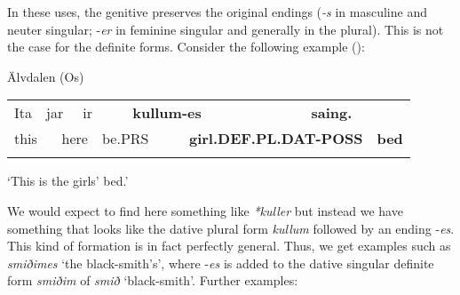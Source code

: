 In these uses, the genitive preserves the original endings (\textit{\nobreakdash-s }in masculine and neuter singular; \nobreakdash-\textit{er} in feminine singular and generally in the plural). This is not the case for the definite forms. Consider the following example (\citet[96]{Levander1909}):


\begin{listWWNumileveli}
\item {}

\begin{styleExample}
Älvdalen (Os)

\end{styleExample}

\end{listWWNumileveli}

\begin{tabular}{llllllllll}
\lsptoprule
Ita & \multicolumn{2}{l}{jar

} & \multicolumn{2}{l}{ir

} & \multicolumn{2}{l}{{\bfseries kullum-es}

} & \multicolumn{2}{l}{{\bfseries saing.}

} & \\
\multicolumn{2}{l}{this

} & \multicolumn{2}{l}{here

} & \multicolumn{2}{l}{be.PRS

} & \multicolumn{2}{l}{{\bfseries girl.DEF.PL.DAT-POSS}

} & \multicolumn{2}{l}{{\bfseries bed}

}\\
\lspbottomrule
\end{tabular}

\begin{styleTranslation}
‘This is the girls’ bed.’

\end{styleTranslation}

\begin{styleBodyTextFirst}
We would expect to find here something like \textit{*kuller }but instead we have something that looks like the dative plural form \textit{kullum} followed by an ending \nobreakdash-\textit{es}. This kind of formation is in fact perfectly general. Thus, we get examples such as \textit{smiðimes} ‘the black-smith’s’, where \nobreakdash-\textit{es }is added to the dative singular definite form \textit{smiðim} of \textit{smið} ‘black-smith’. Further examples:

\end{styleBodyTextFirst}

